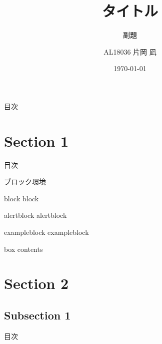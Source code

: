 \documentclass[aspectratio=169, dvipdfmx, 14pt, xcolor={svgnames,dvipsnames}]{beamer}
\title[Short title]{タイトル}
\subtitle{副題}
\author[Kataoka Nagi]{AL18036 片岡 凪}
\institute[AL18036]{芝浦工業大学 工学部 情報工学科 4年}
\date{\today}
\begin{document}

\maketitle


\begin{frame}{目次}
  \tableofcontents
\end{frame}


\section{Section 1}
\begin{frame}{目次}
  \tableofcontents[currentsection]
\end{frame}


\begin{frame}{ブロック環境}
  \begin{block}{block}
    block
  \end{block}
  \begin{alertblock}{alertblock}
    alertblock
  \end{alertblock}
  \begin{exampleblock}{exampleblock}
    exampleblock
  \end{exampleblock}
  \begin{tcolorbox}[colframe=green,
      colback=green!10!white,
      colbacktitle=green!40!white,
      coltitle=black, fonttitle=\bfseries,
      title=My box]
    box contents
  \end{tcolorbox}
\end{frame}


\section{Section 2}
\subsection{Subsection 1}
\begin{frame}{目次}
  \tableofcontents[currentsection]
\end{frame}
\end{document}
